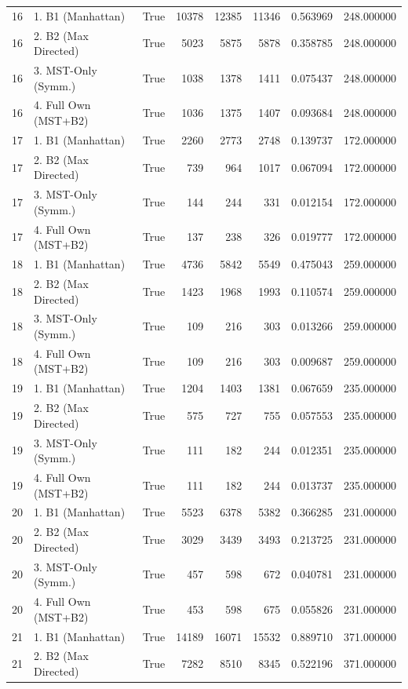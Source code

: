 \begin{table}[htbp]
\begin{tabular}{rlrrrrrr}
16 & 1. B1 (Manhattan) & True & 10378 & 12385 & 11346 & 0.563969 & 248.000000 \\
16 & 2. B2 (Max Directed) & True & 5023 & 5875 & 5878 & 0.358785 & 248.000000 \\
16 & 3. MST-Only (Symm.) & True & 1038 & 1378 & 1411 & 0.075437 & 248.000000 \\
16 & 4. Full Own (MST+B2) & True & 1036 & 1375 & 1407 & 0.093684 & 248.000000 \\
17 & 1. B1 (Manhattan) & True & 2260 & 2773 & 2748 & 0.139737 & 172.000000 \\
17 & 2. B2 (Max Directed) & True & 739 & 964 & 1017 & 0.067094 & 172.000000 \\
17 & 3. MST-Only (Symm.) & True & 144 & 244 & 331 & 0.012154 & 172.000000 \\
17 & 4. Full Own (MST+B2) & True & 137 & 238 & 326 & 0.019777 & 172.000000 \\
18 & 1. B1 (Manhattan) & True & 4736 & 5842 & 5549 & 0.475043 & 259.000000 \\
18 & 2. B2 (Max Directed) & True & 1423 & 1968 & 1993 & 0.110574 & 259.000000 \\
18 & 3. MST-Only (Symm.) & True & 109 & 216 & 303 & 0.013266 & 259.000000 \\
18 & 4. Full Own (MST+B2) & True & 109 & 216 & 303 & 0.009687 & 259.000000 \\
19 & 1. B1 (Manhattan) & True & 1204 & 1403 & 1381 & 0.067659 & 235.000000 \\
19 & 2. B2 (Max Directed) & True & 575 & 727 & 755 & 0.057553 & 235.000000 \\
19 & 3. MST-Only (Symm.) & True & 111 & 182 & 244 & 0.012351 & 235.000000 \\
19 & 4. Full Own (MST+B2) & True & 111 & 182 & 244 & 0.013737 & 235.000000 \\
20 & 1. B1 (Manhattan) & True & 5523 & 6378 & 5382 & 0.366285 & 231.000000 \\
20 & 2. B2 (Max Directed) & True & 3029 & 3439 & 3493 & 0.213725 & 231.000000 \\
20 & 3. MST-Only (Symm.) & True & 457 & 598 & 672 & 0.040781 & 231.000000 \\
20 & 4. Full Own (MST+B2) & True & 453 & 598 & 675 & 0.055826 & 231.000000 \\
21 & 1. B1 (Manhattan) & True & 14189 & 16071 & 15532 & 0.889710 & 371.000000 \\
21 & 2. B2 (Max Directed) & True & 7282 & 8510 & 8345 & 0.522196 & 371.000000 \\

\end{tabular}
\end{table}
